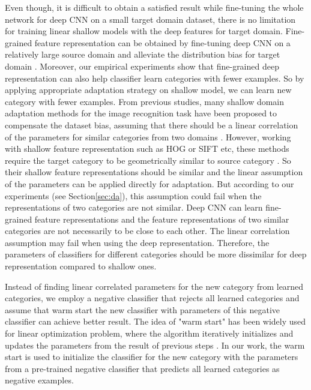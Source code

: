Even though, it is difficult to obtain a satisfied result while fine-tuning the whole network for deep CNN on a small target domain dataset, there is no limitation for training linear shallow models with the deep features for target domain. Fine-grained feature representation can be obtained by fine-tuning deep CNN on a relatively large source domain and alleviate the distribution bias for target domain \cite{zhang2014part}. Moreover, our empirical experiments show that fine-grained deep representation can also help classifier learn categories with fewer examples.
So by applying appropriate adaptation strategy on shallow model, we can learn new category with fewer examples. From previous studies, many shallow domain adaptation methods for the image recognition task have been proposed to compensate the dataset bias, assuming that there should be a linear correlation of the parameters for similar categories from two domains \cite{daume2009frustratingly} \cite{yang2007adapting} \cite{aytar2011tabula}.
However, working with shallow feature representation such as HOG or SIFT etc, these methods require the target category to be geometrically similar to source category \cite{aytar2011tabula}. So their shallow feature representations should be similar and the linear assumption of the parameters can be applied directly for adaptation. But according to our experiments (see Section\ref{sec:da}), this assumption could fail when the representations of two categories are not similar.
Deep CNN can learn fine-grained feature representations and the feature representations of two similar categories are not necessarily to be close to each other. The linear correlation assumption may fail when using the deep representation. Therefore, the parameters of classifiers for different categories should be more dissimilar for deep representation compared to shallow ones.

Instead of finding linear correlated parameters for the new category from learned categories, we employ a negative classifier that rejects all learned categories and assume that warm start the new classifier with parameters of this negative classifier can achieve better result. The idea of "warm start" has been widely used for linear optimization problem, where the algorithm iteratively initializes and updates the parameters from the result of previous steps \cite{yildirim2002warm} \cite{john2008implementation} \cite{zeilinger2011real} \cite{chuwarm}. In our work, the warm start is used to initialize the classifier for the new category with the parameters from a pre-trained negative classifier that predicts all learned categories as negative examples.

